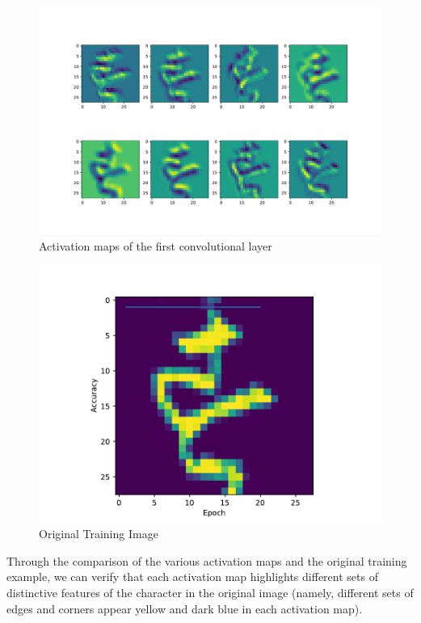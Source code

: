 \begin{questions}
            \begin{figure}[h]
                \centering
                \includegraphics[scale=0.5]{activation_maps.pdf}
                \caption{Activation maps of the first convolutional layer}
                \label{fig:activation}
            \end{figure}
            \begin{figure}[h]
                \centering
                \includegraphics[scale=0.4]{original_image.pdf}
                \caption{Original Training Image}
                \label{fig:orig}
            \end{figure}
             Through the comparison of the various activation maps and the original training example, we can verify that each activation map highlights different sets of distinctive features of the character in the original image (namely, different sets of edges and corners appear yellow and dark blue in each activation map).


    \end{questions}

